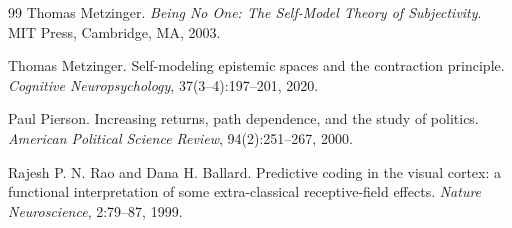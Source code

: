 \documentclass[11pt,a4paper]{article}
\theoremstyle{remark}
\begin{document}
\begin{thebibliography}{99}
Thomas Metzinger.
\newblock \emph{Being No One: The Self-Model Theory of Subjectivity}.
\newblock MIT Press, Cambridge, MA, 2003.

Thomas Metzinger.
\newblock Self-modeling epistemic spaces and the contraction principle.
\newblock \emph{Cognitive Neuropsychology}, 37(3--4):197--201, 2020.

Paul Pierson.
\newblock Increasing returns, path dependence, and the study of politics.
\newblock \emph{American Political Science Review}, 94(2):251--267, 2000.

Rajesh P. N. Rao and Dana H. Ballard.
\newblock Predictive coding in the visual cortex: a functional interpretation of some extra-classical receptive-field effects.
\newblock \emph{Nature Neuroscience}, 2:79--87, 1999.

\end{thebibliography}
\end{document}

